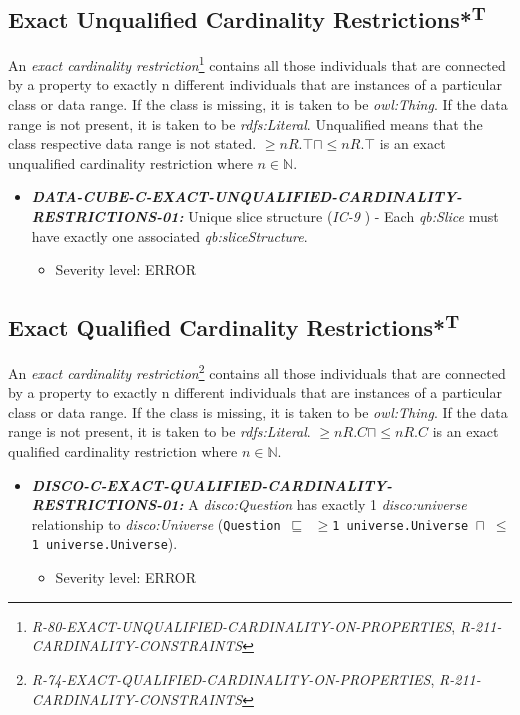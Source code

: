 \documentclass{llncs}
\newcommand{\ms}[1]{\texttt{#1}}
\begin{document}
\subsection{Exact Unqualified Cardinality Restrictions*\textsuperscript{T}}

An \emph{exact cardinality restriction}\footnote{{\em R-80-EXACT-UNQUALIFIED-CARDINALITY-ON-PROPERTIES}, {\em R-211-CARDINALITY-CONSTRAINTS}} contains all those individuals that are connected by a property to exactly n different individuals that are instances of a particular class or data range. 
If the class is missing, it is taken to be \emph{owl:Thing}. 
If the data range is not present, it is taken to be \emph{rdfs:Literal}.
Unqualified means that the class respective data range is not stated. 
$\geq n R. \top \sqcap \leq n R. \top $ is an exact unqualified cardinality restriction where $n \in \mathbb{N}$.

\begin{itemize}
	\item \textbf{{\em DATA-CUBE-C-EXACT-UNQUALIFIED-CARDINALITY-RESTRICTIONS-01:}}
	Unique slice structure (\emph{IC-9} \cite{CyganiakReynolds2014}) -  
	Each \emph{qb:Slice} must have exactly one associated \emph{qb:sliceStructure}. 
	\begin{itemize}
		\item Severity level: ERROR
	\end{itemize}
\end{itemize}

\subsection{Exact Qualified Cardinality Restrictions*\textsuperscript{T}}

An \emph{exact cardinality restriction}\footnote{{\em R-74-EXACT-QUALIFIED-CARDINALITY-ON-PROPERTIES}, {\em R-211-CARDINALITY-CONSTRAINTS}} contains all those individuals that are connected by a property to exactly n different individuals that are instances of a particular class or data range. 
If the class is missing, it is taken to be \emph{owl:Thing}. 
If the data range is not present, it is taken to be \emph{rdfs:Literal}.
$\geq n R. C \sqcap \leq n R. C $ is an exact qualified cardinality restriction where $n \in \mathbb{N}$.

\begin{itemize}
	\item \textbf{{\em DISCO-C-EXACT-QUALIFIED-CARDINALITY-RESTRICTIONS-01:}}
A {\em disco:Question} has exactly 1 {\em disco:universe} relationship to {\em disco:Universe} (\ms{Question $\sqsubseteq$ $\geq$1 universe.Universe $\sqcap$ $\leq$1 universe.Universe}).
  \begin{itemize}
		\item Severity level: ERROR
	\end{itemize}
\end{itemize}
\end{document}
